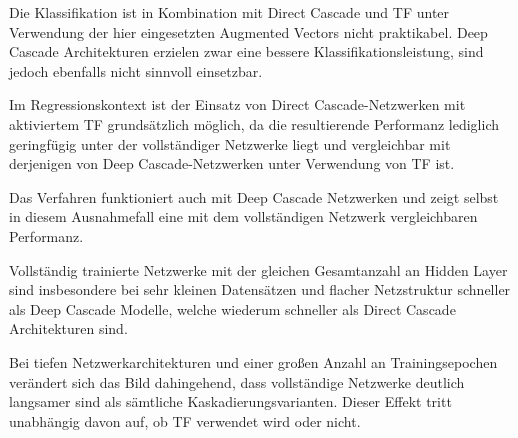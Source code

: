 Die Klassifikation ist in Kombination mit Direct Cascade und TF unter Verwendung der hier eingesetzten Augmented Vectors nicht praktikabel. 
Deep Cascade Architekturen erzielen zwar eine bessere Klassifikationsleistung, sind jedoch ebenfalls nicht sinnvoll einsetzbar.

Im Regressionskontext ist der Einsatz von Direct Cascade-Netzwerken mit aktiviertem TF grundsätzlich möglich, da die resultierende Performanz 
lediglich geringfügig unter der vollständiger Netzwerke liegt und vergleichbar mit derjenigen von Deep Cascade-Netzwerken unter Verwendung von 
TF ist.

Das Verfahren funktioniert auch mit Deep Cascade Netzwerken und zeigt selbst in diesem Ausnahmefall eine mit dem vollständigen Netzwerk 
vergleichbaren Performanz.

Vollständig trainierte Netzwerke mit der gleichen Gesamtanzahl an Hidden Layer sind insbesondere bei sehr kleinen Datensätzen und flacher 
Netzstruktur schneller als Deep Cascade Modelle, welche wiederum schneller als Direct Cascade Architekturen sind. 

Bei tiefen Netzwerkarchitekturen und einer großen Anzahl an Trainingsepochen verändert sich das Bild dahingehend, dass vollständige Netzwerke 
deutlich langsamer sind als sämtliche Kaskadierungsvarianten. Dieser Effekt tritt unabhängig davon auf, ob TF verwendet wird oder nicht.

